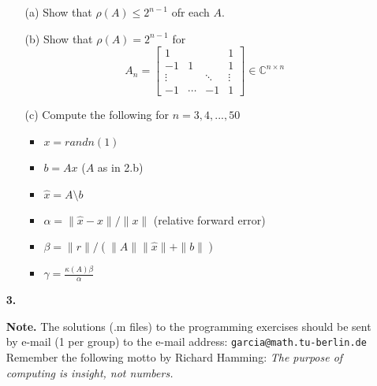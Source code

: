 \documentclass[10pt]{report}
\begin{document}
\begin{enumerate}
  \begin{enumerate}
    \item[(a)] Show that $\rho(A)\leq2^{n-1}$ ofr each $A$.
    \item[(b)] Show that $\rho(A)=2^{n-1}$ for
    \[A_n=\left[\begin{array}{rccc}1&&&1\\-1&1&&1\\\vdots&&\ddots&\vdots\\-1&\cdots&-1&1\end{array}\right]\in\mathbb{C}^{n\times n}\]
    \item[(c)]Compute the following for $n=3,4,...,50$
      \begin{itemize}
        \item $x=randn(1)$
        \item $b=Ax$ ($A$ as in 2.b)
        \item $\hat{x}=A\setminus b$
        \item $\alpha=\|\hat{x}-x\|/\|x\|$ (relative forward error)
        \item $\beta=\|r\|/(\|A\|\|\hat{x}\|+\|b\|)$
        \item $\gamma=\frac{\kappa(A)\beta}{\alpha}$
        \end{itemize}
  \end{enumerate}

\vspace{0.1cm} 

\item[\textbf{3.}] 

\vspace{0.1cm} 

\item[\textbf{Note.}] The solutions (.m files) to the programming exercises should be sent by e-mail (1 per group) to the e-mail address: \verb+garcia@math.tu-berlin.de+ \\

Remember the following motto by Richard Hamming: 
\textit{The purpose of computing is insight, not numbers.}

\end{enumerate}
\end{document}
